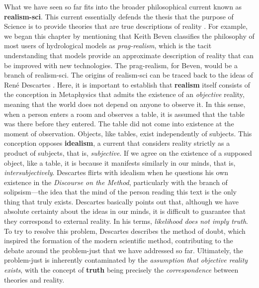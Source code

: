 \documentclass[./main_en.tex]{subfiles}
\begin{document}
\par What we have seen so far fits into the broader philosophical current known as \textbf{\gls{realism-sci}}. This current essentially defends the thesis that the purpose of Science is to provide theories that are true descriptions of reality \cite{bas1980}. For example, we began this chapter by mentioning that Keith Beven classifies the philosophy of most users of hydrological models as \textit{\gls{prag-realism}}, which is the tacit understanding that models provide an approximate description of reality that can be improved with new technologies. The \gls{prag-realism}, for Beven, would be a branch of \gls{realism-sci}. The origins of \gls{realism-sci} can be traced back to the ideas of René Descartes \cite{Agazzi2017}. Here, it is important to establish that \textbf{\gls{realism}} itself consists of the conception in Metaphysics that admits the existence of an \textit{objective} reality, meaning that the world does not depend on anyone to observe it. In this sense, when a person enters a room and observes a table, it is assumed that the table was there before they entered. The table did not come into existence at the moment of observation. Objects, like tables, exist independently of subjects. This conception opposes \textbf{\gls{idealism}}, a current that considers reality strictly as a product of subjects, that is, \textit{subjective}. If we agree on the existence of a supposed object, like a table, it is because it manifests similarly in our minds, that is, \textit{intersubjectively}. Descartes flirts with \gls{idealism} when he questions his own existence in the \textit{Discourse on the Method}, particularly with the branch of solipsism—the idea that the mind of the person reading this text is the only thing that truly exists. Descartes basically points out that, although we have absolute certainty about the ideas in our minds, it is difficult to guarantee that they correspond to external reality. In his terms, \textit{\gls{likelihood} does not imply truth}. To try to resolve this problem, Descartes describes the method of doubt, which inspired the formation of the modern scientific method, contributing to the debate around the \gls{problem-just} that we have addressed so far. Ultimately, the \gls{problem-just} is inherently contaminated by the \textit{assumption that objective reality exists}, with the concept of \textbf{truth} being precisely the \textit{correspondence} between theories and reality.
\end{document}
